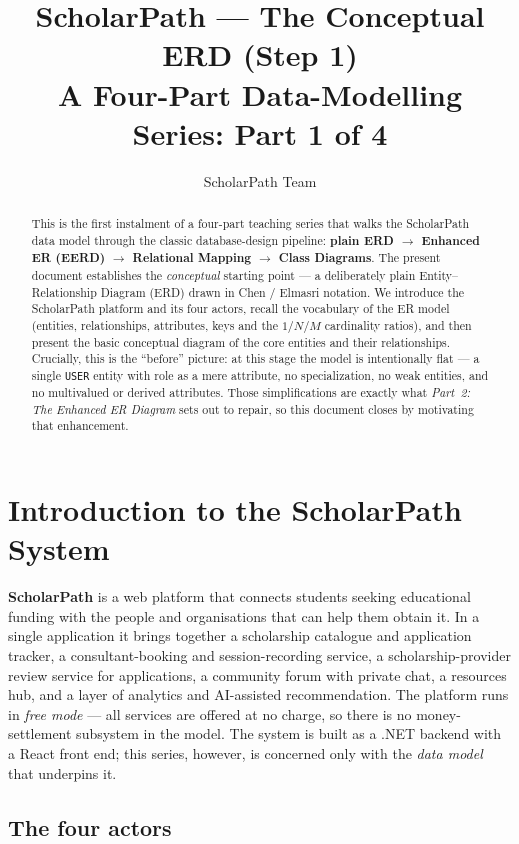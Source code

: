 \documentclass[11pt,a4paper]{article}
\title{ScholarPath --- The Conceptual ERD (Step 1)\\[0.3em]
\large A Four-Part Data-Modelling Series: Part 1 of 4}
\author{ScholarPath Team}
\date{}
\begin{document}
\maketitle

\begin{abstract}
\noindent
This is the first instalment of a four-part teaching series that walks the
ScholarPath data model through the classic database-design pipeline:
\textbf{plain ERD $\rightarrow$ Enhanced ER (EERD) $\rightarrow$ Relational
Mapping $\rightarrow$ Class Diagrams}. The present document establishes the
\emph{conceptual} starting point --- a deliberately plain Entity--Relationship
Diagram (ERD) drawn in Chen / Elmasri notation. We introduce the ScholarPath
platform and its four actors, recall the vocabulary of the ER model (entities,
relationships, attributes, keys and the $1$/$N$/$M$ cardinality ratios), and
then present the basic conceptual diagram of the core entities and
their relationships. Crucially, this is the ``before'' picture: at this stage
the model is intentionally flat --- a single \texttt{USER} entity with role as a
mere attribute, no specialization, no weak entities, and no multivalued or
derived attributes. Those simplifications are exactly what \emph{Part~2: The
Enhanced ER Diagram} sets out to repair, so this document closes by motivating
that enhancement.
\end{abstract}

\tableofcontents

\section{Introduction to the ScholarPath System}

\textbf{ScholarPath} is a web platform that connects students seeking
educational funding with the people and organisations that can help them obtain
it. In a single application it brings together a scholarship catalogue and
application tracker, a consultant-booking and session-recording service, a
scholarship-provider review service for applications, a community forum with
private chat, a resources hub, and a layer of analytics and AI-assisted
recommendation. The platform runs in \emph{free mode} --- all services are
offered at no charge, so there is no money-settlement subsystem in the model.
The system is built as a .NET backend with a React front end; this series,
however, is concerned only with the \emph{data model} that underpins it.

\subsection{The four actors}
\end{document}
